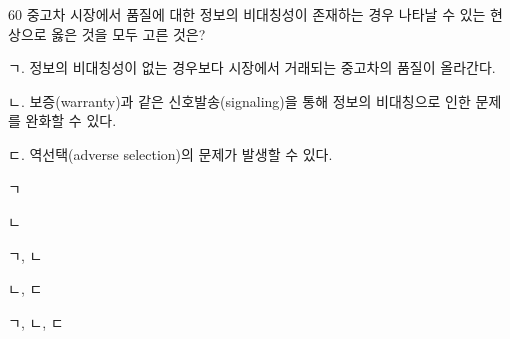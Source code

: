 \begin{question}{60}
중고차 시장에서 품질에 대한 정보의 비대칭성이 존재하는 경우 나타날 수 있는 현상으로 옳은 것을 모두 고른 것은?
\begin{framedtext}
ㄱ. 정보의 비대칭성이 없는 경우보다 시장에서 거래되는 중고차의 품질이 올라간다. \par
ㄴ. 보증(warranty)과 같은 신호발송(signaling)을 통해 정보의 비대칭으로 인한 문제를 완화할 수 있다. \par
ㄷ. 역선택(adverse selection)의 문제가 발생할 수 있다. \par
\end{framedtext}
\begin{choices}
  \item ㄱ
  \item ㄴ
  \item ㄱ, ㄴ
  \item ㄴ, ㄷ
  \item ㄱ, ㄴ, ㄷ
\end{choices}
\end{question}

